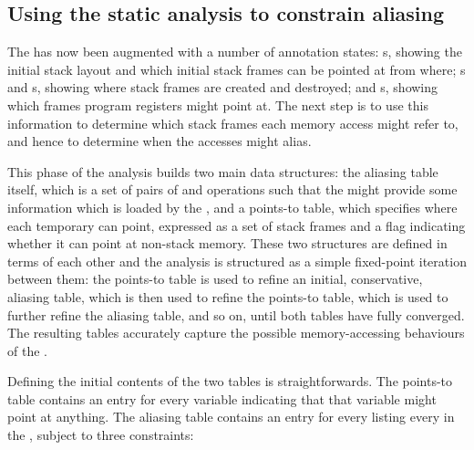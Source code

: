 
\subsection{Using the static analysis to constrain aliasing}

The {\StateMachine} has now been augmented with a number of annotation
states: s, showing the initial stack layout and
which initial stack frames can be pointed at from where;
s and s, showing where stack
frames are created and destroyed; and s, showing
which frames program registers might point at.  The next step is to
use this information to determine which stack frames each memory
access might refer to, and hence to determine when the accesses might
alias.

This phase of the analysis builds two main data structures: the
aliasing table itself, which is a set of pairs of  and
 operations such that the  might provide
some information which is loaded by the , and a points-to
table, which specifies where each {\StateMachine} temporary can point,
expressed as a set of stack frames and a flag indicating whether it
can point at non-stack memory.  These two structures are defined in
terms of each other and the analysis is structured as a simple
fixed-point iteration between them: the points-to table is used to
refine an initial, conservative, aliasing table, which is then used to refine the points-to
table, which is used to further refine the aliasing table, and so on,
until both tables have fully converged.  The resulting tables
accurately capture the possible memory-accessing behaviours of the
{\StateMachine}.

Defining the initial contents of the two tables is straightforwards.
The points-to table contains an entry for every {\StateMachine}
variable indicating that that variable might point at anything.  The
aliasing table contains an entry for every  listing every
 in the {\StateMachine}, subject to three constraints:


